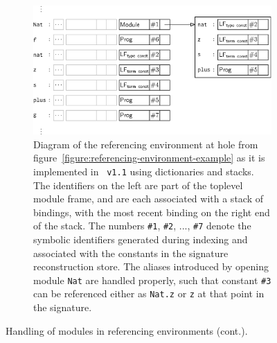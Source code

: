 \begin{figure}\ContinuedFloat
\begin{subfigure}{\linewidth}
\includegraphics{figures/referencing-environment-implementation.eps}
\caption[]{%
Diagram of the referencing environment at hole \texttt{} from figure~\ref{figure:referencing-environment-example} as it is implemented in \Beluga~\texttt{v1.1} using dictionaries and stacks.
The identifiers on the left are part of the toplevel module frame, and are each associated with a stack of bindings, with the most recent binding on the right end of the stack.
The numbers \texttt{\#1}, \texttt{\#2}, ..., \texttt{\#7} denote the symbolic identifiers generated during indexing and associated with the constants in the signature reconstruction store.
The aliases introduced by opening module \texttt{Nat} are handled properly, such that constant \texttt{\#3} can be referenced either as \texttt{Nat.z} or \texttt{z} at that point in the signature.
}
\label{figure:referencing-environment-implementation}
\end{subfigure}
\caption[]{Handling of modules in referencing environments (cont.).}
\end{figure}

